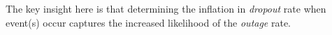 The key insight here is that determining the inflation in \emph{dropout} rate when event(s) occur captures the increased likelihood of the \emph{outage} rate. 




 